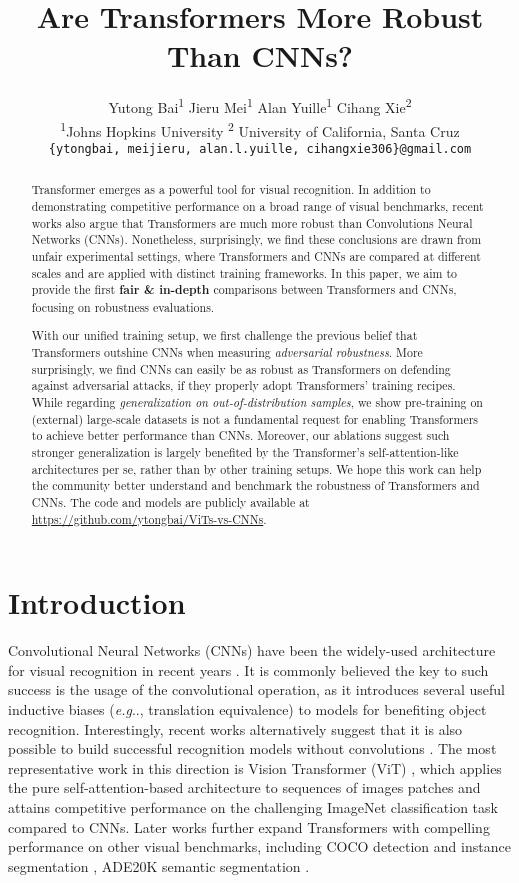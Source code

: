 \documentclass{article}
\title{Are Transformers More Robust Than CNNs? }
\author{
Yutong Bai\textsuperscript{1} \quad
Jieru Mei\textsuperscript{1} \quad
Alan Yuille\textsuperscript{1} \quad
Cihang Xie\textsuperscript{2} \vspace{.3em}\\
\textsuperscript{1}Johns Hopkins University \qquad\qquad \textsuperscript{2} University of California, Santa Cruz \vspace{.2em}\\
\texttt{\{ytongbai, meijieru, alan.l.yuille, cihangxie306\}@gmail.com}
}
\makeatletter
\DeclareRobustCommand\onedot{\futurelet\@let@token\@onedot}
\def\@onedot{\ifx\@let@token.\else.\null\fi\xspace}
\def\eg{\emph{e.g}\onedot} \def\Eg{\emph{E.g}\onedot}
\makeatother
\begin{document}
\maketitle
\begin{abstract}
Transformer emerges as a powerful tool for visual recognition. In addition to demonstrating competitive performance on a broad range of visual benchmarks,  recent works also argue that Transformers are much more robust than Convolutions Neural Networks (CNNs). Nonetheless, surprisingly, we find these conclusions are drawn from unfair experimental settings, where Transformers and CNNs are compared at different scales and are applied with distinct training frameworks. In this paper, we aim to provide the first \textbf{fair \& in-depth} comparisons between Transformers and CNNs, focusing on robustness evaluations. 

With our unified training setup, we first challenge the previous belief that Transformers outshine CNNs when measuring \emph{adversarial robustness}. More surprisingly, we find CNNs can easily be as robust as Transformers on defending against adversarial attacks, if they properly adopt Transformers' training recipes. While regarding \emph{generalization on out-of-distribution samples}, we show pre-training on (external) large-scale datasets is not a fundamental request for enabling Transformers to achieve better performance than CNNs. Moreover, our ablations suggest such stronger generalization is largely benefited by the Transformer's self-attention-like architectures per se, rather than by other training setups. We hope this work can help the community better understand and benchmark the robustness of Transformers and CNNs. The code and models are publicly available at \url{https://github.com/ytongbai/ViTs-vs-CNNs}. 
\end{abstract}



\section{Introduction}
Convolutional Neural Networks (CNNs) have been the widely-used architecture for visual recognition in recent years \cite{Krizhevsky2012,Simonyan2015,Szegedy2015a,He2016,huang2017densely}. It is commonly believed the key to such success is the usage of the convolutional operation, as it introduces several useful inductive biases (\eg, translation equivalence) to models for benefiting object recognition. Interestingly, recent works alternatively suggest that it is also possible to build successful recognition models without convolutions \cite{ramachandran2019stand,Zhao_2020_CVPR,bello2019attention}. The most representative work in this direction is Vision Transformer (ViT) \cite{dosovitskiy2020image}, which applies the pure self-attention-based architecture to sequences of images patches and attains competitive performance on the challenging ImageNet classification task \cite{Russakovsky2015} compared to CNNs. Later works \cite{liu2021swin,wang2021pyramid} further expand Transformers with compelling performance on other visual benchmarks, including COCO detection and instance segmentation \cite{lin2014microsoft}, ADE20K semantic segmentation \cite{zhou2017scene}.
   
\end{document}
